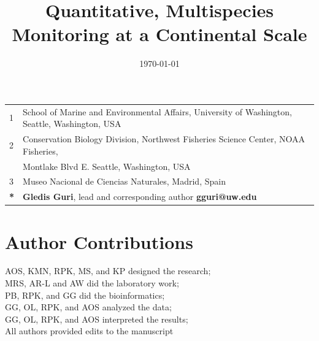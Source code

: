\documentclass{article}
\title{Quantitative, Multispecies Monitoring at a Continental Scale}
\author{Gledis Guri$^1$\textbf{*} \and
Owen Liu$^2$ \and
Ryan P. Kelly$^1$ \and
Megan R. Shaffer$^1$\and
Kim Parsons$^2$ \and
Ana Ram\'on-Laca$^{1,2,3}$ \and
Krista M. Nichols$^2$ \and
Pedro F. P. Brandão-Dias$^1$ \and
Abigail Wells$^2$ \and
Andrew Olaf Shelton$^2$ \and}
\date{\today}
\begin{document}
\maketitle

\section*{}

\begin{center}
\begin{tabular}{ll}
1 & School of Marine and Environmental Affairs, University of Washington, Seattle, Washington, USA \\
2 & Conservation Biology Division, Northwest Fisheries Science Center,  NOAA Fisheries, \\
 & \qquad 2715 Montlake Blvd E. Seattle, Washington, USA \\
3 & Museo Nacional de Ciencias Naturales, Madrid, Spain \\
\hline
\textbf{*} & \textbf{Gledis Guri}, lead and corresponding author \textbf{gguri@uw.edu}
\end{tabular}
\end{center}


\section*{Author Contributions}
AOS, KMN, RPK, MS, and KP designed the research;\\
MRS, AR-L and AW did the laboratory work; \\
PB, RPK, and GG did the bioinformatics;\\
GG, OL, RPK, and AOS analyzed the data;\\
GG, OL, RPK, and AOS interpreted the results;\\
All authors provided edits to the manuscript \\
\end{document}
